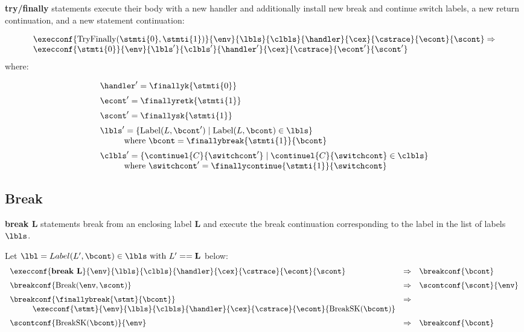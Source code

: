 \documentclass{article}
\begin{document}
\noindent
\textbf{try/finally} statements execute their body with a new handler and additionally install new break and continue switch labels, a new return continuation, and a new statement continuation:

\[
  \begin{array}{lcl}
	\execconf{\mathrm{TryFinally}(\stmti{0}, \stmti{1})}{\env}{\lbls}{\clbls}{\handler}{\cex}{\cstrace}{\econt}{\scont}
	\Rightarrow\\
	\execconf{\stmti{0}}{\env}{\lbls'}{\clbls'}{\handler'}{\cex}{\cstrace}{\econt'}{\scont'}
	  \end{array}
\]
where:

\[
  \begin{array}{lcl}
	\handler' = \finallyk{\stmti{0}}\hspace{50mm}\\[2mm]

	\econt' = \finallyretk{\stmti{1}}\\[2mm]

	\scont' = \finallysk{\stmti{1}}\\[2mm]

	\lbls' = \lbrace \mathrm{Label}(L, \bcont') \mid \mathrm{Label}(L, \bcont) \in \lbls\rbrace \\
	\hspace{10mm}\textrm{where } \bcont = \finallybreak{\stmti{1}}{\bcont}\\[2mm]
	\clbls' =  \lbrace \continuel{C}{\switchcont'} \mid  \continuel{C}{\switchcont} \in \clbls\rbrace\\
	\hspace{10mm}\textrm{where } \switchcont' = \finallycontinue{\stmti{1}}{\switchcont}

  \end{array}
\]
\subsection{Break}
\textbf{break L} statements break from an enclosing label \textbf{L} and execute the break continuation corresponding to the label in the list of labels $\lbls$.

Let $\lbl = Label(L', \bcont) \in \lbls \textrm{ with } L' == \mathbf{L}$ below:
\[
  \begin{array}{lcl}
	\execconf{\textbf{break L}}{\env}{\lbls}{\clbls}{\handler}{\cex}{\cstrace}{\econt}{\scont}
	& \Rightarrow &
	\breakconf{\bcont}\\[2mm]

	\breakconf{\mathrm{Break}(\env, \scont)}
	& \Rightarrow &
	\scontconf{\scont}{\env}\\[2mm]

	\breakconf{\finallybreak{\stmt}{\bcont}}
	& \Rightarrow \\
	\hspace{10mm}\execconf{\stmt}{\env}{\lbls}{\clbls}{\handler}{\cex}{\cstrace}{\econt}{\mathrm{BreakSK}(\bcont)}\\[2mm]

	\scontconf{\mathrm{BreakSK}(\bcont)}{\env}
	& \Rightarrow &
	\breakconf{\bcont}

  \end{array}
\]
\end{document}
